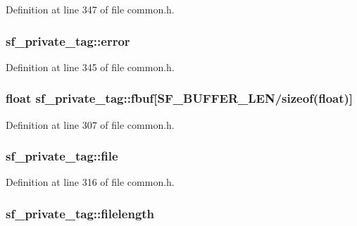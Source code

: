 Definition at line 347 of file common.\+h.

\subsubsection[{\texorpdfstring{error}{error}}]{ sf\+\_\+private\+\_\+tag\+::error}\hypertarget{structsf__private__tag_a4213ea059db3a7b9453342f6e9714649}{}\label{structsf__private__tag_a4213ea059db3a7b9453342f6e9714649}


Definition at line 345 of file common.\+h.

\subsubsection[{\texorpdfstring{fbuf}{fbuf}}]{\setlength{\rightskip}{0pt plus 5cm}float sf\+\_\+private\+\_\+tag\+::fbuf\mbox{[}{\bf S\+F\+\_\+\+B\+U\+F\+F\+E\+R\+\_\+\+L\+EN}/sizeof(float)\mbox{]}}\hypertarget{structsf__private__tag_a0982b1c5b45421facc65b9ffeccc3642}{}\label{structsf__private__tag_a0982b1c5b45421facc65b9ffeccc3642}


Definition at line 307 of file common.\+h.

\subsubsection[{\texorpdfstring{file}{file}}]{ sf\+\_\+private\+\_\+tag\+::file}\hypertarget{structsf__private__tag_aba0363a05c5d908f7af983ca82a7b881}{}\label{structsf__private__tag_aba0363a05c5d908f7af983ca82a7b881}


Definition at line 316 of file common.\+h.

\subsubsection[{\texorpdfstring{filelength}{filelength}}]{ sf\+\_\+private\+\_\+tag\+::filelength}\hypertarget{structsf__private__tag_aff3f5c2bc2a2a312a6ad71f2c38ea74d}{}\label{structsf__private__tag_aff3f5c2bc2a2a312a6ad71f2c38ea74d}


